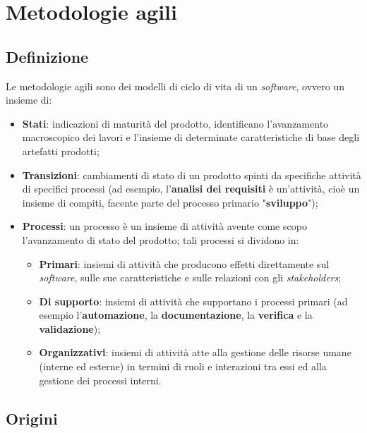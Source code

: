 \chapter{Metodologie agili}

\section{Definizione}
Le metodologie agili sono dei modelli di ciclo di vita di un \textit{software}, ovvero un insieme di:
\begin{itemize}
    \item \textbf{Stati}: indicazioni di maturità del prodotto, identificano l'avanzamento macroscopico dei lavori e l'insieme di determinate caratteristiche di base degli artefatti prodotti;
    \item \textbf{Transizioni}: cambiamenti di stato di un prodotto spinti da specifiche attività di specifici processi (ad esempio, l'\textbf{analisi dei requisiti} è un'attività, cioè un insieme di compiti, facente parte del processo primario "\textbf{sviluppo}");
    \item \textbf{Processi}: un processo è un insieme di attività avente come scopo l'avanzamento di stato del prodotto; tali processi si dividono in:
        \begin{itemize}
            \item \textbf{Primari}: insiemi di attività che producono effetti direttamente sul \textit{software}, sulle sue caratteristiche e sulle relazioni con gli \textit{stakeholders};
            \item \textbf{Di supporto}: insiemi di attività che supportano i processi primari (ad esempio l'\textbf{automazione}, la \textbf{documentazione}, la \textbf{verifica} e la \textbf{validazione});
            \item \textbf{Organizzativi}: insiemi di attività atte alla gestione delle risorse umane (interne ed esterne) in termini di ruoli e interazioni tra essi ed alla gestione dei processi interni.
        \end{itemize}
\end{itemize}

\section{Origini}








